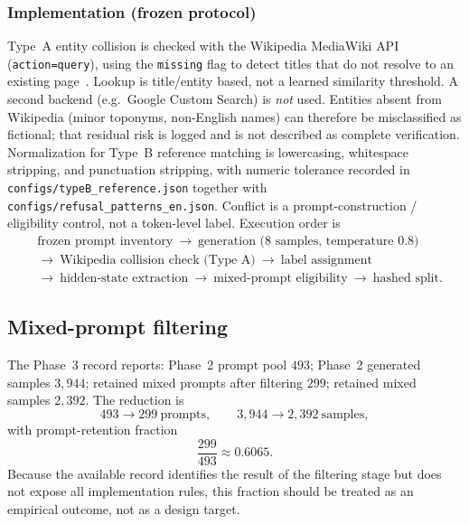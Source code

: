 \documentclass{article}
\begin{document}
\subsubsection{Implementation (frozen protocol)}
Type~A entity collision is checked with the Wikipedia {MediaWiki} {API} (\texttt{action=query}), using the \texttt{missing} flag to detect titles that do not resolve to an existing page~\citep{exptrj001plan}. Lookup is title/entity based, not a learned similarity threshold. A second backend (e.g.\ Google Custom Search) is \emph{not} used. Entities absent from Wikipedia (minor toponyms, non-English names) can therefore be misclassified as fictional; that residual risk is logged and is not described as complete verification.
Normalization for Type~B reference matching is lowercasing, whitespace stripping, and punctuation stripping, with numeric tolerance recorded in \texttt{configs/typeB\_reference.json} together with \texttt{configs/refusal\_patterns\_en.json}.
Conflict is a prompt-construction / eligibility control, not a token-level label. Execution order is
\begin{equation}
\begin{aligned}
&\text{frozen prompt inventory}
\ \rightarrow\
\text{generation ($8$ samples, temperature $0.8$)}\\
&\rightarrow\
\text{{Wikipedia} collision check (Type~A)}
\ \rightarrow\
\text{label assignment}\\
&\rightarrow\
\text{hidden-state extraction}
\ \rightarrow\
\text{mixed-prompt eligibility}
\ \rightarrow\
\text{hashed split}.
\end{aligned}
\end{equation}

\subsection{Mixed-prompt filtering}
\label{app:b-mixed}

The Phase~3 record reports:
Phase~2 prompt pool $493$;
Phase~2 generated samples $3{,}944$;
retained mixed prompts after filtering $299$;
retained mixed samples $2{,}392$.
The reduction is
\begin{equation}
  493\rightarrow 299\ \text{prompts},
  \qquad
  3{,}944\rightarrow 2{,}392\ \text{samples},
\end{equation}
with prompt-retention fraction
\begin{equation}
  \frac{299}{493}\approx 0.6065.
\end{equation}
Because the available record identifies the result of the filtering stage but does not expose all implementation rules, this fraction should be treated as an empirical outcome, not as a design target.
\end{document}
